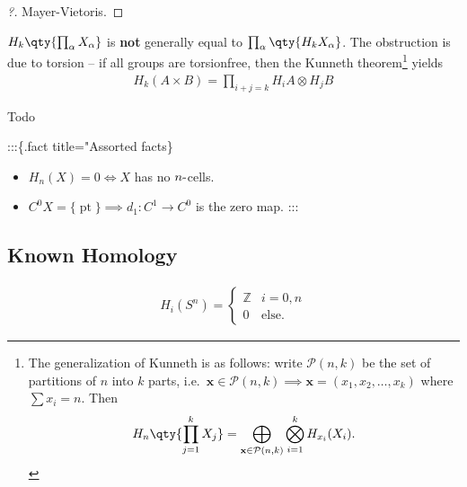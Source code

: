 \begin{proof}[?]

Mayer-Vietoris.

\end{proof}

\begin{warnings}

\(H_{k} \qty{ \prod_ \alpha X_ \alpha}\) is \textbf{not} generally equal
to \(\prod_ \alpha \qty{ H_{k} X_ \alpha }\). The obstruction is due to
torsion -- if all groups are torsionfree, then the Kunneth
theorem\footnote{The generalization of Kunneth is as follows: write
  \(\mathcal{P}(n, k)\) be the set of partitions of \(n\) into \(k\)
  parts,
  i.e.~\(\mathbf{x} \in \mathcal{P}(n,k) \implies \mathbf{x} = (x_{1}, x_{2}, \ldots, x_{k})\)
  where \(\sum x_{i} = n\). Then
  \begin{align*}
  H_{n}\qty{\prod_{j=1}^k X_{j}} = \bigoplus_{\mathbf{x} \in \mathcal{P}(n,k)} \bigotimes_{i=1}^{k} H_{x_{i}}(X_{i}).
  \end{align*}
} yields
\begin{align*}
H_{k} (A\times B) = \prod_{i+j=k} H_{i} A \otimes H_{j} B
\end{align*}

\end{warnings}

\begin{theorem}[Excision]

Todo

\end{theorem}


:::\{.fact title="Assorted facts\} \envlist

\begin{itemize}
\tightlist
\item
  \(H_{n}(X) = 0 \iff X\) has no \(n{\hbox{-}}\)cells.
\item
  \(C^0 X = {\{\operatorname{pt}\}}\implies d_{1}: C^1 \to C^0\) is the
  zero map. :::
\end{itemize}

\hypertarget{known-homology}{%
\subsection{Known Homology}\label{known-homology}}

\begin{example}[Spheres]

\begin{align*}
H_{i}(S^n) = 
\begin{cases}
{\mathbb{Z}}& i = 0, n
\\
0 & \text{else}.
\end{cases}
\end{align*}

\end{example}

